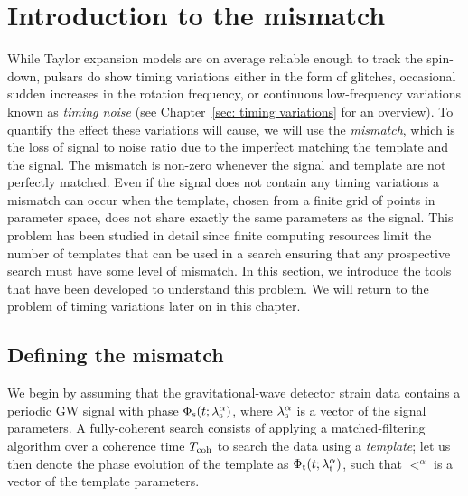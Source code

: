 \documentclass[../full_thesis/full_thesis.tex]{subfiles}
\begin{document}
\section{Introduction to the mismatch}
\label{sec: introduction to the mismatch}
While Taylor expansion models are on average reliable enough to track the
spin-down, pulsars do show timing variations either in the form of glitches,
occasional sudden increases in the rotation frequency, or continuous
low-frequency variations known as \emph{timing noise} (see Chapter~\ref{sec:
timing variations} for an overview). To quantify the effect these variations
will cause, we will use the \emph{mismatch}, which is the loss of signal to
noise ratio due to the imperfect matching the template and the signal. The
mismatch is non-zero whenever the signal and template are not perfectly
matched. Even if the signal does not contain any timing variations a mismatch
can occur when the template, chosen from a finite grid of points in parameter
space, does not share exactly the same parameters as the signal. This problem
has been studied in detail since finite computing resources limit the number of
templates that can be used in a search ensuring that any prospective search
must have some level of mismatch. In this section, we introduce the tools
that have been developed to understand this problem. We will return to the
problem of timing variations later on in this chapter.

\subsection{Defining the mismatch}

We begin by assuming that the gravitational-wave detector strain data contains
a periodic GW signal with phase $\Phi_{\textrm{s}}(t; {\lambda}_\textrm{s}^{\alpha})$, where ${\lambda}_\textrm{s}^{\alpha}$
is a vector of the signal parameters. A fully-coherent search consists of
applying a matched-filtering algorithm over a coherence time $T_{\mathrm{coh}}$ to search
the data using a \emph{template}; let us then denote the phase evolution of the
template as $\Phi_{\textrm{t}}(t; {\lambda}_\textrm{t}^{\alpha})$, such that $\lt^{\alpha}$ is a vector of
the template parameters.
\end{document}
